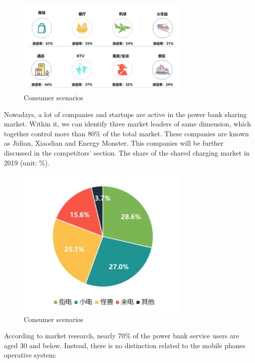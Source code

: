 \documentclass[12pt]{article}
\begin{document}
            \begin{figure}[h]
                \centering
                \includegraphics[width=0.75\textwidth]{china_locations}
                \caption{Consumer scenarios}
            \end{figure}            
            Nowadays, a lot of companies and startups are active in the power bank sharing market. 
            Within it, we can identify three market leaders of same dimension, which together control more than 80\% of the total market. 
            These companies are known as Jidian, Xiaodian and Energy Monster. This companies will be further discussed in the competitors' section. 
            The share of the shared charging market in 2019 (unit: \%). 
            \begin{figure}[h]
                \centering
                \includegraphics[width=0.75\textwidth]{china_pie_chart}
                \caption{Consumer scenarios}
            \end{figure}
            According to market research, nearly 70\% of the power bank service users are aged 30 and below. 
            Instead, there is no distinction related to the mobile phones operative system: 
\end{document}
